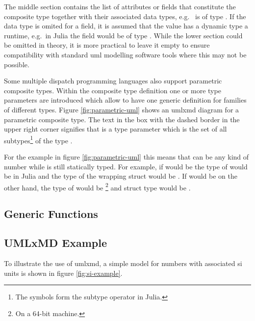 The middle section contains the list of attributes or fields that constitute the composite type together with their associated data types, e.g.~ is of type .
If the data type is omited for a field, it is assumed that the value has a dynamic type a runtime, e.g.~in Julia the field would be of type .
While the lower section could be omitted in theory, it is more practical to leave it empty to ensure compatibility with standard \ac{uml} modelling software tools where this may not be possible.

Some multiple dispatch programming languages also support parametric composite types.
Within the composite type definition one or more type parameters are introduced which allow to have one generic definition for families of different types.
Figure \ref{fig:parametric-uml} shows an \ac{umlxmd} diagram for a parametric composite type.
The text in the box with the dashed border in the upper right corner signifies that  is a type parameter which is the set of all subtypes\footnote{The symbols \code{<:} form the subtype operator in Julia.} of the type .

For the example in figure \ref{fig:parametric-uml} this means that  can be any kind of number while  is still statically typed.
For example, if  would be  the type of  would be  in Julia and the type of the wrapping  struct would be .
If  would be  on the other hand, the type of  would be \footnote{On a 64-bit machine.} and struct type would be .

\subsection{Generic Functions}
\label{sec:generic-functions}

\subsection{UMLxMD Example}
\label{sec:umlxmd-example}
To illustrate the use of \ac{umlxmd}, a simple model for numbers with associated \ac{si} units is shown in figure \ref{fig:si-example}.



